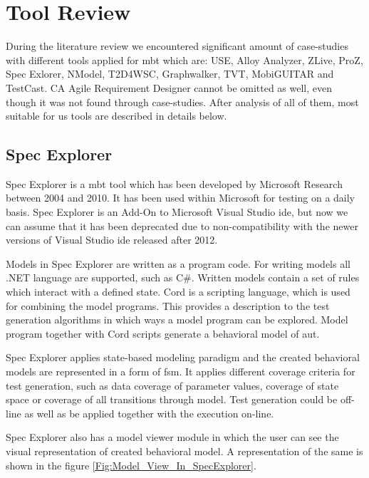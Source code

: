 \section{Tool Review}
During the literature review we encountered significant amount of case-studies with different tools applied for \acrshort{mbt} which are: USE, Alloy Analyzer, ZLive, ProZ, Spec Exlorer, NModel, T2D4WSC, Graphwalker, TVT, MobiGUITAR and TestCast. CA Agile Requirement Designer cannot be omitted as well, even though it was not found through case-studies. After analysis of all of them, most suitable for us tools are described in details below.

\subsection{Spec Explorer}
\par
Spec Explorer \cite{SpecExplorer_Description} is a \acrshort{mbt} tool which has been developed by Microsoft Research between 2004 and 2010. It has been used within Microsoft for testing on a daily basis. Spec Explorer is an Add-On to Microsoft Visual Studio \acrshort{ide}, but now we can assume that it has been deprecated due to non-compatibility with the newer versions of Visual Studio \acrshort{ide} released after 2012.
\par
Models in Spec Explorer are written as a program code. For writing models all .NET language are supported, such as C\#. Written models contain a set of rules which interact with a defined state. Cord is a scripting language, which is used for combining the model programs. This provides a description to the test generation algorithms in which ways a model program can be explored. Model program together with Cord scripts generate a behavioral model of \acrlong{aut}.

\par
Spec Explorer applies state-based modeling paradigm and the created behavioral models are represented in a form of \acrshort{fsm}. It applies different coverage criteria for test generation, such as data coverage of parameter values, coverage of state space or coverage of all transitions through model. Test generation could be off-line as well as be applied together with the execution on-line.

\par
Spec Explorer also has a model viewer module in which the user can see the visual representation of created behavioral model. A representation of the same is shown in the figure \ref{Fig:Model_View_In_SpecExplorer}.

